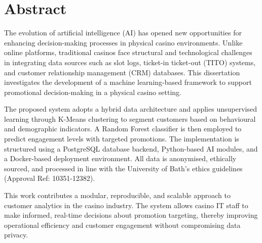 \chapter*{Abstract}

\noindent
The evolution of artificial intelligence (AI) has opened new opportunities for enhancing decision-making processes in physical casino environments. Unlike online platforms, traditional casinos face structural and technological challenges in integrating data sources such as slot logs, ticket-in ticket-out (TITO) systems, and customer relationship management (CRM) databases. This dissertation investigates the development of a machine learning-based framework to support promotional decision-making in a physical casino setting.

The proposed system adopts a hybrid data architecture and applies unsupervised learning through K-Means clustering to segment customers based on behavioural and demographic indicators. A Random Forest classifier is then employed to predict engagement levels with targeted promotions. The implementation is structured using a PostgreSQL database backend, Python-based AI modules, and a Docker-based deployment environment. All data is anonymised, ethically sourced, and processed in line with the University of Bath's ethics guidelines (Approval Ref: 10351-12382).

This work contributes a modular, reproducible, and scalable approach to customer analytics in the casino industry. The system allows casino IT staff to make informed, real-time decisions about promotion targeting, thereby improving operational efficiency and customer engagement without compromising data privacy.
